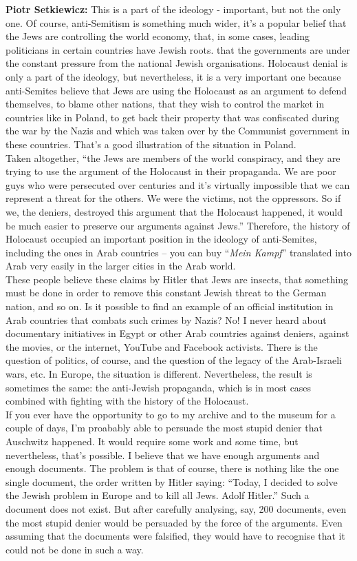 \textbf{Piotr Setkiewicz:} This is a part of the ideology - important, but not the only one. Of course, anti-Semitism is something much wider, it’s a popular belief that the Jews are controlling the world economy, that, in some cases, leading politicians in certain countries have Jewish roots. that the governments are under the constant pressure from the national Jewish organisations. Holocaust denial is only a part of the ideology, but nevertheless, it is a very important one because anti-Semites believe that Jews are using the Holocaust as an argument to defend themselves, to blame other nations, that they wish to control the market in countries like in Poland, to get back their property that was confiscated during the war by the Nazis and which was taken over by the Communist government in these countries. That’s a good illustration of the situation in Poland.\\ Taken altogether, ``the Jews are members of the world conspiracy, and they are trying to use the argument of the Holocaust in their propaganda. We are poor guys who were persecuted over centuries and it’s virtually impossible that we can represent a threat for the others. We were the victims, not the oppressors. So if we, the deniers, destroyed this argument that the Holocaust happened, it would be much easier to preserve our arguments against Jews.'' Therefore, the history of Holocaust occupied an important position in the ideology of anti-Semites, including the ones in Arab countries – you can buy ``\textit{Mein Kampf}'' translated into Arab very easily in the larger cities in the Arab world.\\ 
These people believe these claims by Hitler that Jews are insects, that something must be done in order to remove this constant Jewish threat to the German nation, and so on. Is it possible to find an example of an official institution in Arab countries that combats such crimes by Nazis? No! I never heard about documentary initiatives in Egypt or other Arab countries against deniers, against the movies, or the internet, YouTube and Facebook activists. There is the question of politics, of course, and the question of the legacy of the Arab-Israeli wars, etc. In Europe, the situation is different. Nevertheless, the result is sometimes the same: the anti-Jewish propaganda, which is in most cases combined with fighting with the history of the Holocaust.\\ 
If you ever have the opportunity to go to my archive and to the museum for a couple of days, I’m proabably able to persuade the most stupid denier that Auschwitz happened. It would require some work and some time, but nevertheless, that’s possible. I believe that we have enough arguments and enough documents. The problem is that of course, there is nothing like the one single document, the order written by Hitler saying: ``Today, I decided to solve the Jewish problem in Europe and to kill all Jews. Adolf Hitler.'' Such a document does not exist. But after carefully analysing, say, 200 documents, even the most stupid denier would be persuaded by the force of the arguments. Even assuming that the documents were falsified, they would have to recognise that it could not be done in such a way. \\
